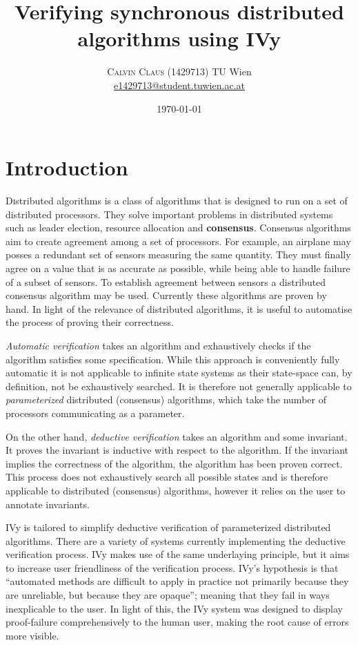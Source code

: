 \documentclass[fleqn]{article}
\title{Verifying synchronous distributed algorithms using IVy} %
\author{%
  \textsc{Calvin Claus (1429713)}
  \normalsize TU Wien\\ %
  \normalsize \href{mailto:e1429713@student.tuwien.ac.at}{e1429713@student.tuwien.ac.at} %
}
\date{\today} %
\begin{document}
\maketitle


\section{Introduction}

\lettrine[nindent=0em,lines=3]{D}istributed algorithms is a class of algorithms that is designed to run on a set of distributed processors. They solve important problems in distributed systems such as leader election, resource allocation and \textbf{consensus}. Consensus algorithms aim to create agreement among a set of processors. For example, an airplane may posses a redundant set of sensors measuring the same quantity. They must finally agree on a value that is as accurate as possible, while being able to handle failure of a subset of sensors. To establish agreement between sensors a distributed consensus algorithm may be used.  Currently these algorithms are proven by hand. In light of the relevance of distributed algorithms, it is useful to automatise the process of proving their correctness.

  \textit{Automatic verification} takes an algorithm and exhaustively checks if the algorithm satisfies some specification. While this approach is conveniently fully automatic it is not applicable to infinite state systems as their state-space can, by definition, not be exhaustively searched. It is therefore not generally applicable to \textit{parameterized} distributed (consensus) algorithms, which take the number of processors communicating as a parameter.\cite{limits}

  On the other hand, \textit{deductive verification} takes an algorithm and some invariant. It proves the invariant is inductive with respect to the algorithm. If the invariant implies the correctness of the algorithm, the algorithm has been proven correct. This process does not exhaustively search all possible states and is therefore applicable to distributed (consensus) algorithms, however it relies on the user to annotate invariants.

  IVy is tailored to simplify deductive verification of parameterized distributed algorithms. There are a variety of systems currently implementing the deductive verification process. IVy makes use of the same underlaying principle, but it aims to increase user friendliness of the verification process.  IVy's hypothesis is that ``automated methods are difficult to apply in practice not primarily because they are unreliable, but because they are opaque''; meaning that they fail in ways inexplicable to the user. In light of this, the IVy system was designed to display proof-failure comprehensively to the human user, making the root cause of errors more visible. \cite[ p.1]{ivy}
\end{document}
